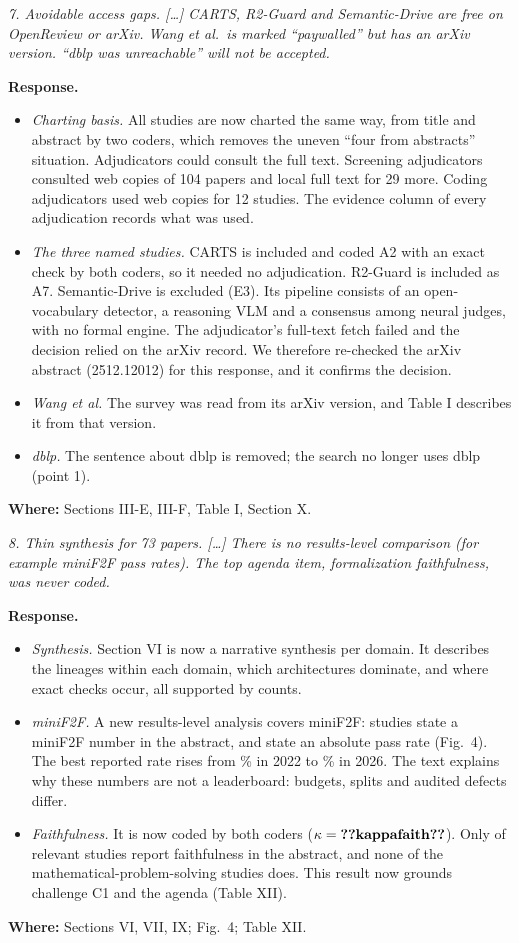 \documentclass[10pt,a4paper]{article}
\newenvironment{referee}{\par\medskip\noindent\begin{minipage}{\linewidth}\color{black!65}\itshape}{\end{minipage}\par\smallskip}
\newcommand{\resp}{\noindent\textbf{Response.} }
\newcommand{\where}[1]{\par\noindent\textbf{Where:} #1\par}
\begin{document}
\begin{referee}
7. Avoidable access gaps. [\ldots] CARTS, R2-Guard and Semantic-Drive are free on OpenReview or arXiv. Wang et al.\ is marked ``paywalled'' but has an arXiv version. ``dblp was unreachable'' will not be accepted.
\end{referee}
\resp
\begin{itemize}
  \item \emph{Charting basis.} All studies are now charted the same way, from title and abstract by two coders, which removes the uneven ``four from abstracts'' situation. Adjudicators could consult the full text. Screening adjudicators consulted web copies of 104 papers and local full text for 29 more. Coding adjudicators used web copies for 12 studies. The evidence column of every adjudication records what was used.
  \item \emph{The three named studies.} CARTS is included and coded A2 with an exact check by both coders, so it needed no adjudication. R2-Guard is included as A7. Semantic-Drive is excluded (E3). Its pipeline consists of an open-vocabulary detector, a reasoning VLM and a consensus among neural judges, with no formal engine. The adjudicator's full-text fetch failed and the decision relied on the arXiv record. We therefore re-checked the arXiv abstract (2512.12012) for this response, and it confirms the decision.
  \item \emph{Wang et al.} The survey was read from its arXiv version, and Table I describes it from that version.
  \item \emph{dblp.} The sentence about dblp is removed; the search no longer uses dblp (point 1).
\end{itemize}
\where{Sections III-E, III-F, Table I, Section X.}

\begin{referee}
8. Thin synthesis for 73 papers. [\ldots] There is no results-level comparison (for example miniF2F pass rates). The top agenda item, formalization faithfulness, was never coded.
\end{referee}
\resp
\begin{itemize}
  \item \emph{Synthesis.} Section VI is now a narrative synthesis per domain. It describes the lineages within each domain, which architectures dominate, and where exact checks occur, all supported by counts.
  \item \emph{miniF2F.} A new results-level analysis covers miniF2F:  studies state a miniF2F number in the abstract, and  state an absolute pass rate (Fig.~4). The best reported rate rises from \% in 2022 to \% in 2026. The text explains why these numbers are not a leaderboard: budgets, splits and audited defects differ.
  \item \emph{Faithfulness.} It is now coded by both coders ($\kappa=\cnt{kappafaith}$). Only  of  relevant studies report faithfulness in the abstract, and none of the  mathematical-problem-solving studies does. This result now grounds challenge C1 and the agenda (Table XII).
\end{itemize}
\where{Sections VI, VII, IX; Fig.~4; Table XII.}
\end{document}
